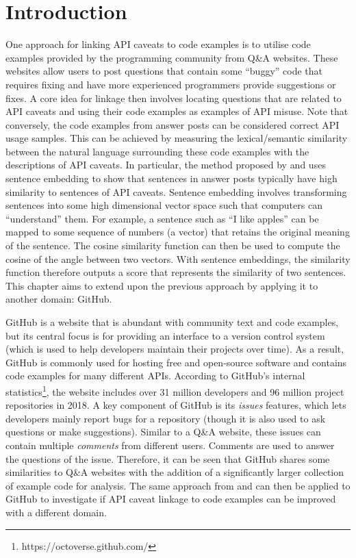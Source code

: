 \section{Introduction}
\label{sec:info-intro}
One approach for linking API caveats to code examples is to utilise code examples provided by the programming community from Q\&A websites. These websites allow users to post questions that contain some ``buggy'' code that requires fixing and have more experienced programmers provide suggestions or fixes. A core idea for linkage then involves locating questions that are related to API caveats and using their code examples as examples of API misuse. Note that conversely, the code examples from answer posts can be considered correct API usage samples. This can be achieved by measuring the lexical/semantic similarity between the natural language surrounding these code examples with the descriptions of API caveats. In particular, the method proposed by \cite{jiamou} and \cite{xiaoxue} uses sentence embedding to show that sentences in answer posts typically have high similarity to sentences of API caveats. Sentence embedding involves transforming sentences into some high dimensional vector space such that computers can ``understand'' them. For example, a sentence such as ``I like apples'' can be mapped to some sequence of numbers (a vector) that retains the original meaning of the sentence. The cosine similarity function can then be used to compute the cosine of the angle between two vectors. With sentence embeddings, the similarity function therefore outputs a score that represents the similarity of two sentences. This chapter aims to extend upon the previous approach by applying it to another domain: GitHub. \bigbreak

GitHub is a website that is abundant with community text and code examples, but its central focus is for providing an interface to a version control system (which is used to help developers maintain their projects over time). As a result, GitHub is commonly used for hosting free and open-source software and contains code examples for many different APIs. According to GitHub's internal statistics\footnote{https://octoverse.github.com/}, the website includes over 31 million developers and 96 million project repositories in 2018. A key component of GitHub is its \textit{issues} features, which lets developers mainly report bugs for a repository (though it is also used to ask questions or make suggestions). Similar to a Q\&A website, these issues can contain multiple \textit{comments} from different users. Comments are used to answer the questions of the issue. Therefore, it can be seen that GitHub shares some similarities to Q\&A websites with the addition of a significantly larger collection of example code for analysis. The same approach from \cite{jiamou} and \cite{xiaoxue} can then be applied to GitHub to investigate if API caveat linkage to code examples can be improved with a different domain. \bigbreak

